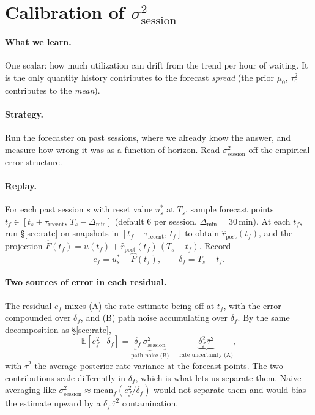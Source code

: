 \documentclass[11pt]{article}
\newcommand{\rpost}{\hat r_{\text{post}}}
\newcommand{\tauzerosq}{\tau_0^2}
\newcommand{\sigsessionsq}{\sigma_{\text{session}}^2}
\newcommand{\taurecent}{\tau_{\text{recent}}}
\begin{document}
\section{Calibration of $\sigsessionsq$}\label{sec:calib}

\paragraph{What we learn.} One scalar: how much utilization can drift from
the trend per hour of waiting. It is the only quantity history contributes
to the forecast \emph{spread} (the prior $\mu_0,\,\tauzerosq$ contributes to
the \emph{mean}).

\paragraph{Strategy.} Run the forecaster on past sessions, where we already
know the answer, and measure how wrong it was as a function of horizon.
Read $\sigsessionsq$ off the empirical error structure.

\paragraph{Replay.} For each past session $s$ with reset value $u_s^\ast$ at
$T_s$, sample forecast points $t_f \in [t_s + \taurecent,\, T_s -
\Delta_{\min}]$ (default 6 per session, $\Delta_{\min} = 30$\,min). At each
$t_f$, run \S\ref{sec:rate} on snapshots in $[t_f - \taurecent,\, t_f]$ to
obtain $\rpost(t_f)$, and the projection $\hat F(t_f) = u(t_f) +
\rpost(t_f)\,(T_s - t_f)$. Record
\[
  e_f = u_s^\ast - \hat F(t_f),
  \qquad
  \delta_f = T_s - t_f.
\]

\paragraph{Two sources of error in each residual.} The residual $e_f$ mixes
(A) the rate estimate being off at $t_f$, with the error compounded over
$\delta_f$, and (B) path noise accumulating over $\delta_f$. By the
same decomposition as \S\ref{sec:rate},
\[
  \mathbb{E}[e_f^2 \mid \delta_f]
  = \underbrace{\delta_f\,\sigsessionsq}_{\text{path noise (B)}}
  + \underbrace{\delta_f^2\,\bar\tau^2}_{\text{rate uncertainty (A)}},
\]
with $\bar\tau^2$ the average posterior rate variance at the forecast
points. The two contributions scale differently in $\delta_f$, which is what
lets us separate them. Naive averaging like $\sigsessionsq \approx
\mathrm{mean}_f(e_f^2 / \delta_f)$ would not separate them and would bias
the estimate upward by a $\delta_f\,\bar\tau^2$ contamination.
\end{document}
